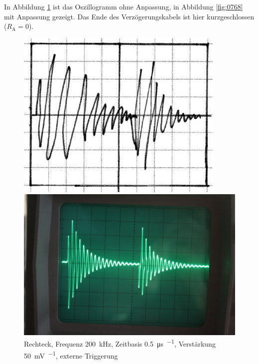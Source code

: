 In Abbildung \ref{fig:0767} ist das Oszillogramm ohne Anpassung, in Abbildung
\ref{fig:0768} mit Anpassung gezeigt. Das Ende des Verzögerungskabels ist hier kurzgeschlossen ($R_\text{A}=0$).

\begin{figure}[htbp]
	\centering
	\begin{minipage}{.45\linewidth}
	\includegraphics[width=\linewidth]{Skizzen/IMG_0767-1500.jpg}
	\end{minipage}
	\hfill
	\begin{minipage}{.45\linewidth}
	\includegraphics[width=\linewidth]{Fotos/IMG_0767-1500.jpg}
	\end{minipage}
	\caption{%
		Rechteck, Frequenz \SI{200}{\kilo\hertz},
		Zeitbasis \SI{.5}{\micro\second\per\division},
		Verstärkung \SI{50}{\milli\volt\per\division},
		externe Triggerung
	}
	\label{fig:0767}
\end{figure}

